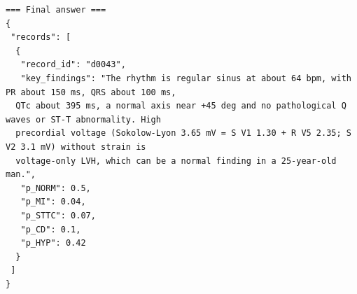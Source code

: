 \begin{scriptsize}
\begin{verbatim}
=== Final answer ===
{
 "records": [
  {
   "record_id": "d0043",
   "key_findings": "The rhythm is regular sinus at about 64 bpm, with PR about 150 ms, QRS about 100 ms, 
  QTc about 395 ms, a normal axis near +45 deg and no pathological Q waves or ST-T abnormality. High 
  precordial voltage (Sokolow-Lyon 3.65 mV = S V1 1.30 + R V5 2.35; S V2 3.1 mV) without strain is 
  voltage-only LVH, which can be a normal finding in a 25-year-old man.",
   "p_NORM": 0.5,
   "p_MI": 0.04,
   "p_STTC": 0.07,
   "p_CD": 0.1,
   "p_HYP": 0.42
  }
 ]
}
\end{verbatim}
\end{scriptsize}
